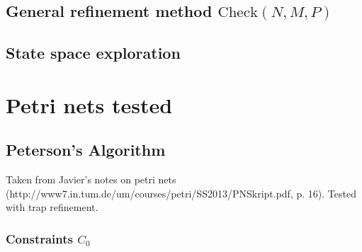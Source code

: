 \documentclass{article}
\begin{document}
\subsection{General refinement method $\text{Check}(N, M, P)$}


\subsection{State space exploration}



\section{Petri nets tested}

\subsection{Peterson's Algorithm}

Taken from Javier's notes on petri nets
(http://www7.in.tum.de/um/courses/petri/SS2013/PNSkript.pdf, p. 16).
Tested with trap refinement.

\subsubsection{Constraints $C_0$}
\end{document}
